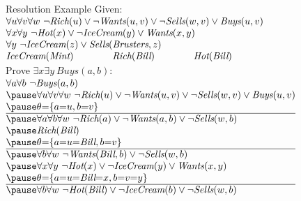 \documentclass[14pt]{beamer}
\begin{document}
\begin{frame}[label=resolution-example]{Resolution Example}
\small
Given:\\
\tab$
\begin{array}{ @{} l @{\hspace{4em}} l @{\hspace{4em}} l @{} }
\lefteqn{\forall u \forall v \forall w\ \lnot\textit{Rich}(u) \lor \lnot\textit{Wants}(u, v) \lor \lnot\textit{Sells}(w, v) \lor \textit{Buys}(u, v)} \\
\lefteqn{\forall x \forall y\ \lnot\textit{Hot}(x) \lor \lnot\textit{IceCream}(y) \lor \textit{Wants}(x, y)} \\
\lefteqn{\forall y\ \lnot\textit{IceCream}(z) \lor \textit{Sells}(\textit{Brusters}, z)} \\
\textit{IceCream}(\textit{Mint})
& \textit{Rich}(\textit{Bill})
& \textit{Hot}(\textit{Bill})
\end{array}
$
\\[0.5em]
Prove $\exists x \exists y\ \textit{Buys}(a, b)$:\\
\pause
\tab$\thickmuskip=0mu
\begin{array}{ @{} l @{} }
\forall a \forall b\ \lnot\textit{Buys}(a, b) \\
\pause
\forall u \forall v \forall w\ \lnot\textit{Rich}(u) \lor \lnot\textit{Wants}(u, v) \lor \lnot\textit{Sells}(w, v) \lor \textit{Buys}(u, v) \\
\pause
\theta = \{ a=u, b=v \} \\
\hline
\pause
\forall a \forall b \forall w\ \lnot\textit{Rich}(a) \lor \lnot\textit{Wants}(a, b) \lor \lnot\textit{Sells}(w, b)\\
\pause
\textit{Rich}(\textit{Bill}) \\
\pause
\theta = \{ a=u=\textit{Bill}, b=v \} \\
\hline
\pause
\forall b \forall w\ \lnot\textit{Wants}(\textit{Bill}, b) \lor \lnot\textit{Sells}(w, b) \\
\pause
\forall x \forall y\ \lnot\textit{Hot}(x) \lor \lnot\textit{IceCream}(y) \lor \textit{Wants}(x, y) \\
\pause
\theta = \{ a=u=\textit{Bill}=x, b=v=y \} \\
\hline
\pause
\forall b \forall w\ \lnot\textit{Hot}(\textit{Bill}) \lor \lnot\textit{IceCream}(b) \lor \lnot\textit{Sells}(w, b) \\
\end{array}
$
\end{frame}
\end{document}
